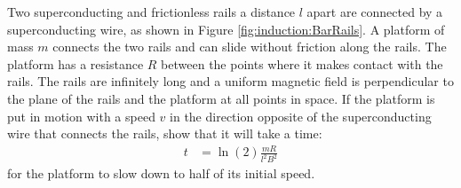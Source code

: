 \question Two superconducting and frictionless rails a distance $l$ apart are connected by a superconducting wire, as shown in Figure \ref{fig:induction:BarRails}. A platform of mass $m$ connects the two rails and can slide without friction along the rails. The platform has a resistance $R$ between the points where it makes contact with the rails. The rails are infinitely long and a uniform magnetic field is perpendicular to the plane of the rails and the platform at all points in space. If the platform is put in motion with a speed $v$ in the direction opposite of the superconducting wire that connects the rails, show that it will take a time:
\begin{align*}
t&=\ln(2)\frac{mR}{l^2B^2}
\end{align*}
for the platform to slow down to half of its initial speed.
